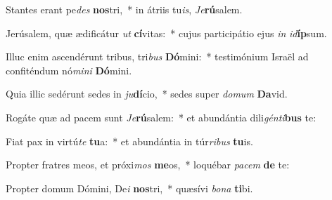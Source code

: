 \item Stantes erant pe\textit{des} \textbf{nos}tri,~* in átriis tu\textit{is}, \textit{Je}\textbf{rú}salem.
\item Jerúsalem, quæ ædificátur \textit{ut} \textbf{cí}vitas:~* cujus participátio ejus \textit{in} \textit{id}\textbf{íp}sum.
\item Illuc enim ascendérunt tribus, tri\textit{bus} \textbf{Dó}mini:~* testimónium Israël ad confiténdum nó\textit{mi}\textit{ni} \textbf{Dó}mini.
\item Quia illic sedérunt sedes in \textit{ju}\textbf{dí}cio,~* sedes super \textit{do}\textit{mum} \textbf{Da}vid.
\item Rogáte quæ ad pacem sunt \textit{Je}\textbf{rú}salem:~* et abundántia dili\textit{gén}\textit{ti}\textbf{bus} te:
\item Fiat pax in virtú\textit{te} \textbf{tu}a:~* et abundántia in túr\textit{ri}\textit{bus} \textbf{tu}is.
\item Propter fratres meos, et próxi\textit{mos} \textbf{me}os,~* loquébar \textit{pa}\textit{cem} \textbf{de} te:
\item Propter domum Dómini, De\textit{i} \textbf{nos}tri,~* quæsívi \textit{bo}\textit{na} \textbf{ti}bi.

